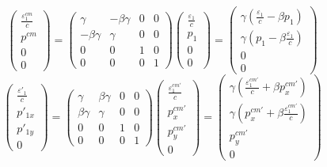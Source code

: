 \documentclass[a4paper,11pt,dvipdfmx]{jsarticle}
\begin{document}
\begin{equation}
    \left(
    \begin{array}{c}
     \frac{\varepsilon^{cm}_{1}}{c}  \\
      p^{cm}\\
      0 \\
      0
    \end{array}
  \right)  = \left(
    \begin{array}{cccc}
      \gamma & -\beta\gamma & 0 & 0 \\
      -\beta\gamma & \gamma & 0 & 0 \\
      0 & 0 & 1 & 0 \\
      0 & 0 & 0 & 1
    \end{array}
    \right) 
      \left(
    \begin{array}{c}
     \frac{\varepsilon_{1}}{c}  \\
      p_{1}\\
      0\\
      0
    \end{array}
  \right) =
    \left(
    \begin{array}{c}
     \gamma\left(\frac{\varepsilon_{1}}{c} -\beta p_{1}\right)  \\
      \gamma\left(p_{1}-\beta\frac{\varepsilon_{1}}{c}\right)\\
      0\\
      0
    \end{array}
  \right) 
\end{equation}
\begin{equation}
    \left(
    \begin{array}{c}
     \frac{\varepsilon'_{1}}{c}  \\
      p'_{1x}\\
      p'_{1y} \\
      0
    \end{array}
  \right)  = \left(
    \begin{array}{cccc}
      \gamma & \beta\gamma & 0 & 0 \\
      \beta\gamma & \gamma & 0 & 0 \\
      0 & 0 & 1 & 0 \\
      0 & 0 & 0 & 1
    \end{array}
    \right) 
      \left(
    \begin{array}{c}
     \frac{\varepsilon^{cm'}_{1}}{c}  \\
      p^{cm'}_{x}\\
      p^{cm'}_{y}\\
      0
    \end{array}
  \right) =
    \left(
    \begin{array}{c}
     \gamma\left(\frac{\varepsilon^{cm'}_{1}}{c} +\beta p^{cm'}_{x}\right)  \\
      \gamma\left(p^{cm'}_{x}+\beta\frac{\varepsilon^{cm'}_{1}}{c}\right)\\
      p^{cm'}_{y}\\
      0
    \end{array}
  \right) 
\end{equation}
\end{document}
